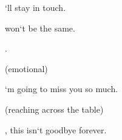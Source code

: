 \documentclass{scrartcl} %
\begin{document}
\begin{titlepage}
\begin{dualdialogue}
    
            \rightcol
    

    
        \characterBOB
    

    
        \dialogueWe`ll stay in touch.
    

    
        \vspace{\baselineskip} %
    

    
        \characterALICE
    

    
        \dialogueIt won`t be the same.
    

    
        \vspace{\baselineskip} %
    

    
        \end{dualdialogue}
    

    
        \actionBeat.
    

    
        \vspace{\baselineskip} %
    

    
        \characterALICE
    

    
        \parenthetical(emotional)
    

    
        \dialogueI`m going to miss you so much.
    

    
        \vspace{\baselineskip} %
    

    
        \characterBOB
    

    
        \parenthetical(reaching across the table)
    

    
        \dialogueHey, this isn`t goodbye forever.
    

    
        \vspace{\baselineskip} %
    

    
        \begin{dualdialogue} %
            \leftcol
    


\end{dualdialogue}
\end{titlepage}
\end{document}
